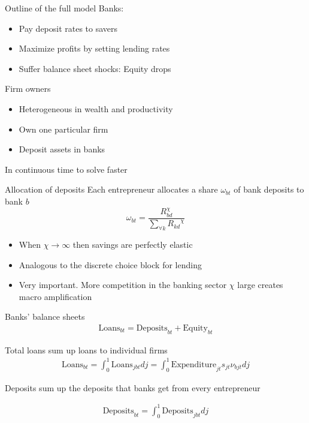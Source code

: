 \documentclass[english,xcolor=svgnames]{beamer}
\begin{document}
\begin{frame}{Outline of the full model}\label{full_model}
Banks:
\begin{itemize}
\item Pay deposit rates to savers 
\item Maximize profits by setting lending rates \hyperlink{rate_setting}{}
\item Suffer balance sheet shocks: Equity drops
\end{itemize}
Firm owners
\begin{itemize}
\item Heterogeneous in wealth and productivity\hyperlink{het_entrep}{}
\item Own one particular firm
\item Deposit assets in banks  \hyperlink{deposits}{}
\end{itemize}
In continuous time to solve faster
\end{frame}



\begin{frame}{Allocation of deposits}\label{deposits}
Each entrepreneur allocates a share $\omega_{bt}$ of bank deposits to bank $b$
$$\omega_{bt} = \frac{R_{bd}^{\chi}}{\sum_{\forall k} {R_{kd}}^{\chi}}$$
\begin{itemize}
\item When $\chi \rightarrow \infty$ then savings are perfectly elastic
\item Analogous to the discrete choice block for lending
\item Very important. More competition in the banking sector $\chi$ large creates macro amplification
\end{itemize}

\end{frame}

\begin{frame}{Banks' balance sheets}\label{bank_bs}
\begin{align}
\text{Loans}_{bt} = \text{Deposits}_{bt} + \text{Equity}_{bt}
\end{align}

Total loans sum up loans to individual firms
\begin{align}
\text{Loans}_{bt} = \int_0^1 \text{Loans}_{jbt} dj  = \int_0^1 \text{Expenditure}_{jt} s_{jt}  \nu_{bjt} dj
\end{align}

Deposits sum up the deposits that banks get from every entrepreneur 

\begin{align}
\text{Deposits}_{bt} = \int_0^1 \text{Deposits}_{jbt} dj 
\end{align}
\hyperlink{exo_process}{}
\hyperlink{sol_meth}{}
\end{frame}
\end{document}
